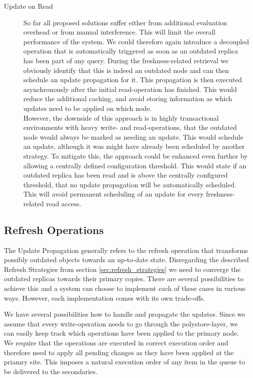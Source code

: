 \begin{description}
    \item[Update on Read] So far all proposed solutions suffer either from additional evaluation overhead or from manual interference. This will limit the overall 
    performance of the system. We could therefore again introduce a decoupled operation that is automatically triggered as soon as an outdated replica has been part of any query. 
    During the freshness-related retrieval we obviously identify that this is indeed an outdated node and can then schedule an update propagation for it. This propagation is then
    executed asynchronously after the initial read-operation has finished. This would reduce the additional caching, and avoid storing 
    information as which updates need to be applied on which node.\\
    However, the downside of this approach is in highly transactional environments with heavy write- and read-operations, that the outdated node would always be marked as 
    needing an update. This would schedule an update, although it was might have already been scheduled by another strategy. 
    To mitigate this, the approach could be enhanced even further by allowing a centrally defined configuration threshold. This would state if an outdated replica has been read
    and is above the centrally configured threshold, that no update propagation will be automatically scheduled.
    This will avoid permanent scheduling of an update for every freshness-related read access.

\end{description}





\subsection{Refresh Operations}

The Update Propagation generally refers to the refresh operation that transforms possibly outdated objects towards an up-to-date state.
Disregarding the described Refresh Strategies from section \ref{sec:refresh_strategies} we need to converge the outdated replicas towards their 
primary copies.
There are several possibilities to achieve this and a system can choose to implement each of these cases in various ways. However, each implementation comes with its
own trade-offs.



\todoMissing{}

We have several possibilities how to handle and propagate the updates.
Since we assume that every write-operation needs to go through the polystore-layer, we can easily keep track which operations have been applied to the primary node.
We require that the operations are executed in correct execution order and therefore need to apply all pending changes as they have been applied at the priamry site.
This imposes a natural execution order of any item in the queue to be delivered to the secondaries.

